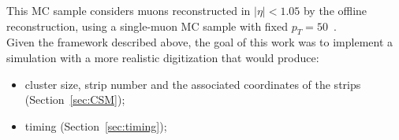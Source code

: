 This MC sample considers muons reconstructed in $|\eta| < 1.05$ by the offline reconstruction, using a single-muon MC sample with fixed \mbox{$p_{T}=50$ \GeV}. \\
Given the framework described above, the goal of this work was to implement a simulation with a more realistic digitization that would produce:
\begin{itemize}
	\item cluster size, strip number and the associated coordinates of the strips (Section~\ref{sec:CSM});
	\item timing (Section~\ref{sec:timing});
\end{itemize}


